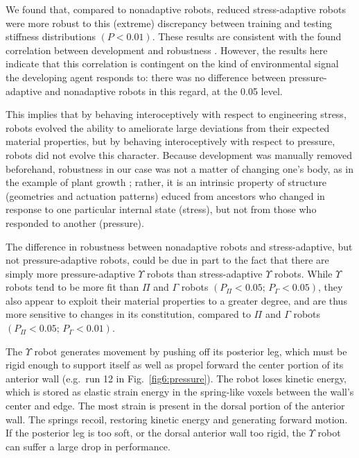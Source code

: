 We found that, compared to nonadaptive robots, reduced stress-adaptive robots 
were 
more robust to this (extreme) discrepancy between training and testing stiffness distributions $(P < 0.01)$.
These results are consistent with the 
found correlation between development and robustness
\cite{miller2004evolving,bongard2011morphological,kriegman2018morphological}.
However, the results here indicate that this correlation is contingent on the kind of environmental
signal the developing agent responds to: there was no difference between pressure-adaptive and nonadaptive robots in this regard, at the 0.05 level.

This implies that by behaving interoceptively with respect to engineering stress, robots evolved the ability to ameliorate large deviations from their expected material properties, but by behaving interoceptively with respect to pressure, robots did not evolve this character.
Because development was manually removed beforehand, robustness in our case was not a matter of changing one's body, as in the example of plant growth \citep{sultan2000phenotypic}; rather, it is an intrinsic property of structure (geometries and actuation patterns) educed from ancestors who changed in response to one particular internal state (stress), but not from those who responded to another (pressure).


The difference in robustness between nonadaptive robots and stress-adaptive, but not pressure-adaptive robots, could be due in part to the fact that there are simply more pressure-adaptive $\Upsilon$ robots than stress-adaptive $\Upsilon$ robots.
While $\Upsilon$ robots tend to be more fit than $\Pi$ and $\Gamma$ robots $(P_{\Pi}<0.05;\, P_{\Gamma}<0.05)$,
they also appear to exploit their material properties to a greater degree, and are thus more sensitive to changes in its constitution, compared to $\Pi$ and $\Gamma$ robots $(P_{\Pi}<0.05;\, P_{\Gamma}<0.01)$.

The $\Upsilon$ robot generates movement by pushing off its posterior leg,
which must be rigid enough to support itself as well as 
propel forward the center portion of its anterior wall 
(e.g.~run 12 in Fig.~\ref{fig6:pressure}).
The robot loses kinetic energy, which is stored as elastic strain energy in the spring-like voxels between the wall's center and edge.
The most strain is present in the dorsal portion of the anterior wall.
The springs recoil, restoring kinetic energy and generating forward motion.
If the posterior leg is too soft, or the dorsal anterior wall too rigid, the $\Upsilon$ robot can suffer a large drop in performance.

